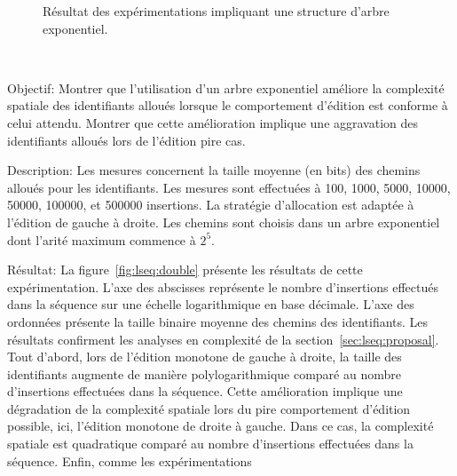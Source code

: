 \begin{figure*}
  \centering
  \hspace{10pt}
  \caption{Résultat des expérimentations impliquant une structure d'arbre exponentiel.}
\end{figure*}

\ \\

\begin{asparadesc}
\item [Objectif:] Montrer que l'utilisation d'un arbre exponentiel améliore la
  complexité spatiale des identifiants alloués lorsque le comportement d'édition
  est conforme à celui attendu. Montrer que cette amélioration implique une
  aggravation des identifiants alloués lors de l'édition pire cas.
\item [Description:] Les mesures concernent la taille moyenne (en bits) des
  chemins alloués pour les identifiants. Les mesures sont effectuées à 100,
  1000, 5000, 10000, 50000, 100000, et 500000 insertions. La stratégie
  d'allocation est adaptée à l'édition de gauche à droite. Les chemins sont
  choisis dans un arbre exponentiel dont l'arité maximum commence à $2^{5}$.
\item [Résultat:] La figure~\ref{fig:lseq:double} présente les résultats de
  cette expérimentation. L'axe des abscisses représente le nombre d'insertions
  effectués dans la séquence sur une échelle logarithmique en base
  décimale. L'axe des ordonnées présente la taille binaire moyenne des chemins
  des identifiants. Les résultats confirment les analyses en complexité de la
  section~\ref{sec:lseq:proposal}. Tout d'abord, lors de l'édition monotone de
  gauche à droite, la taille des identifiants augmente de manière
  polylogarithmique comparé au nombre d'insertions effectuées dans la séquence.
  Cette amélioration implique une dégradation de la complexité spatiale lors du
  pire comportement d'édition possible, ici, l'édition monotone de droite à
  gauche. Dans ce cas, la complexité spatiale est quadratique comparé au nombre
  d'insertions effectuées dans la séquence. Enfin, comme les expérimentations

\end{asparadesc}
